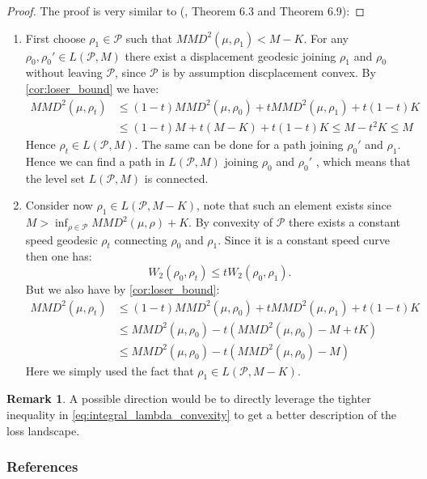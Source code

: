 \documentclass{article}
\newcommand{\1}{\mathbbm 1}
\theoremstyle{definition}
\newtheorem{remark}{Remark}
\begin{document}
%
\begin{proof}
The proof is very similar to (\cite{Bottou:2017}, Theorem 6.3 and
Theorem 6.9): 
\end{proof}
\begin{enumerate}
\item First choose $\rho_{1}\in\mathcal{P}$ such that $MMD^{2}(\mu,\rho_{1})<M-K$.
For any $\rho_{0},\rho_{0}'\in L(\mathcal{P},M)$ there exist a displacement
geodesic joining $\rho_{1}$ and $\rho_{0}$ without leaving $\mathcal{P}$,
since $\mathcal{P}$ is by assumption discplacement convex. By \ref{cor:loser_bound}
we have:
\begin{align*}
MMD^{2}(\mu,\rho_{t}) & \leq(1-t)MMD^{2}(\mu,\rho_{0})+tMMD^{2}(\mu,\rho_{1})+t(1-t)K\\
 & \leq(1-t)M+t(M-K)+t(1-t)K\leq M-t^{2}K\leq M
\end{align*}
Hence $\rho_{t}\in L(\mathcal{P},M)$. The same can be done for a
path joining $\rho_{0}'$ and $\rho_{1}$. Hence we can find a path
in $L(\mathcal{P},M)$ joining $\rho_{0}$ and $\rho_{0}'$ , which
means that the level set $L(\mathcal{P},M)$ is connected.
\item Consider now $\rho_{1}\in L(\mathcal{P},M-K)$, note that such an
element exists since $M>\inf_{\rho\in\mathcal{P}}MMD^{2}(\mu,\rho)+K$.
By convexity of $\mathcal{P}$ there exists a constant speed geodesic
$\rho_{t}$ connecting $\rho_{0}$ and $\rho_{1}$. Since it is a
constant speed curve then one has:
\[
W_{2}(\rho_{0},\rho_{t})\leq tW_{2}(\rho_{0},\rho_{1}).
\]
But we also have by \ref{cor:loser_bound}:
\begin{align*}
MMD^{2}(\mu,\rho_{t}) & \leq(1-t)MMD^{2}(\mu,\rho_{0})+tMMD^{2}(\mu,\rho_{1})+t(1-t)K\\
 & \leq MMD^{2}(\mu,\rho_{0})-t(MMD^{2}(\mu,\rho_{0})-M+tK)\\
 & \leq MMD^{2}(\mu,\rho_{0})-t(MMD^{2}(\mu,\rho_{0})-M)
\end{align*}
Here we simply used the fact that $\rho_{1}\in L(\mathcal{P},M-K)$. 
\end{enumerate}
%

\begin{remark}
	A possible direction would be to directly leverage the tighter inequality in \ref{eq:integral_lambda_convexity} to get a better description of the loss landscape.
\end{remark}



\subsubsection*{References}
\renewcommand\refname{\vskip -1cm}


\end{document}
